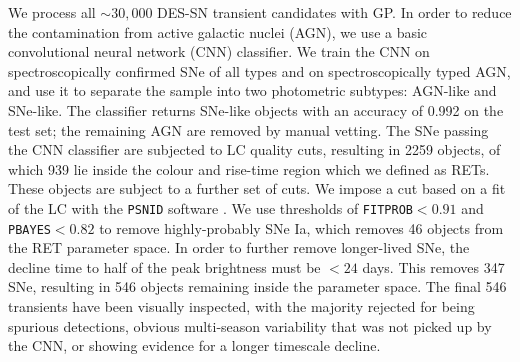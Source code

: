 \documentclass[fleqn,usenatbib,]{mnras}
\begin{document}
We process all $\sim 30,000$ DES-SN transient candidates with GP. In order to reduce the contamination from active galactic nuclei (AGN), we use a basic convolutional neural network (CNN) classifier. We train the CNN on spectroscopically confirmed SNe of all types and on spectroscopically typed AGN, and use it to separate the sample into two photometric subtypes: AGN-like and SNe-like. The classifier returns SNe-like objects with an accuracy of 0.992 on the test set; the remaining AGN are removed by manual vetting.
The SNe passing the CNN classifier are subjected to LC quality cuts, resulting in 2259 objects, of which 939 lie inside the colour and rise-time region which we defined as RETs. These objects are subject to a further set of cuts. We impose a cut based on a fit of the LC with the \texttt{PSNID} software \citep{Sako2008}. We use thresholds of \texttt{FITPROB}$<0.91$ and \texttt{PBAYES}$<0.82$ to remove highly-probably SNe Ia, which removes 46 objects from the RET parameter space. In order to further remove longer-lived SNe, the decline time to half of the peak brightness must be $<24$ days. This removes 347 SNe, resulting in 546 objects remaining inside the parameter space. The final 546 transients have been visually inspected, with the majority rejected for being spurious detections, obvious multi-season variability that was not picked up by the CNN, or showing evidence for a longer timescale decline. 
\end{document}
